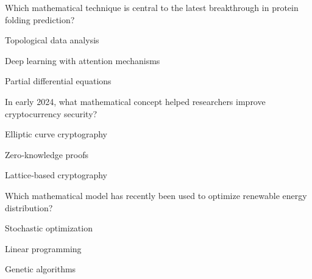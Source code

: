 \begin{enhancedmcq}{Which mathematical technique is central to the latest breakthrough in protein folding prediction?}
\item Topological data analysis
\item Deep learning with attention mechanisms
\item Partial differential equations

\end{enhancedmcq}
\begin{enhancedmcq}{In early 2024, what mathematical concept helped researchers improve cryptocurrency security?}
\item Elliptic curve cryptography
\item Zero‑knowledge proofs
\item Lattice‑based cryptography

\end{enhancedmcq}
\begin{enhancedmcq}{Which mathematical model has recently been used to optimize renewable energy distribution?}
\item Stochastic optimization
\item Linear programming
\item Genetic algorithms
\end{enhancedmcq}